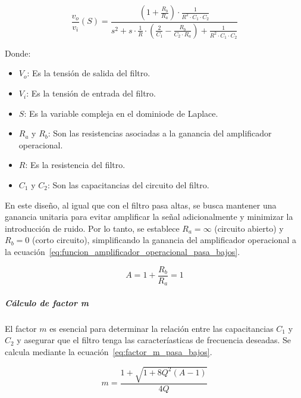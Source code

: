                     \begin{equation}
                        \label{eq:funcion_transferencia_pasa_bajos}
                        \frac{v_o}{v_i}(S) = \frac{(1 + \frac{R_b}{R_a}) \cdot \frac{1}{R^2 \cdot C_1 \cdot C_2}}{s^2 + s \cdot \frac{1}{R} \cdot (\frac{2}{C_1} - \frac{R_b}{C_2 \cdot R_a}) + \frac{1}{R^2 \cdot C_1 \cdot C_2}}
                    \end{equation}

                    Donde:
                    \begin{itemize}
                        \item $V_o$: Es la tensión de salida del filtro.
                        \item $V_i$: Es la tensión de entrada del filtro.
                        \item $S$: Es la variable compleja en el dominiode de Laplace.
                        \item $R_a$ y $R_b$: Son las resistencias asociadas a la ganancia del amplificador operacional.
                        \item $R$: Es la resistencia del filtro.
                        \item $C_1$ y $C_2$: Son las capacitancias del circuito del filtro.
                    \end{itemize}
                    
                    En este diseño, al igual que con el filtro pasa altas, se busca mantener una ganancia unitaria para evitar amplificar la señal adicionalmente y minimizar la introducción de ruido. Por lo tanto, se establece $R_a = \infty$ (circuito abierto) y $R_b = 0$ (corto circuito), simplificando la ganancia del amplificador operacional a la ecuación~\ref{eq:funcion_amplificador_operacional_pasa_bajos}.

                    \begin{equation}
                        \label{eq:funcion_amplificador_operacional_pasa_bajos}
                        A = 1 + \frac{R_b}{R_a} = 1
                    \end{equation}

                \subparagraph{Cálculo de factor m}
                    El factor $m$ es esencial para determinar la relación entre las capacitancias $C_1$ y $C_2$ y asegurar que el filtro tenga las caracteríasticas de frecuencia deseadas. Se calcula mediante la ecuación~\ref{eq:factor_m_pasa_bajos}.

                    \begin{equation}
                        \label{eq:factor_m_pasa_bajos}
                        m = \frac{1+\sqrt{1+8Q^2(A-1)}}{4Q}
                    \end{equation}

